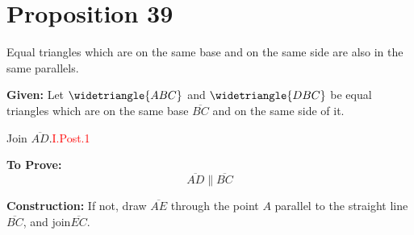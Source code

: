 
\section*{Proposition 39}

\begin{thm}
Equal triangles which are on the same base and on the same side are also in the same parallels.
\end{thm}

\textbf{Given:} Let $\widetriangle{ABC}$ and $\widetriangle{DBC}$ be equal triangles which are on the same base $\overline{BC}$ and on the same side of it. 

Join $\overline{AD}$.\hfill\textcolor{red}{I.Post.1}

\begin{figure}[H]
	\caption{}
\end{figure}

\textbf{To Prove:} 
\[\overline{AD} \parallel  \overline{BC}\]

\textbf{Construction:} If not, draw $\overline{AE}$ through the point $A$ parallel to the straight line $\overline{BC}$, and join$ \overline{EC}$.

\begin{figure}[H]
	\caption{}
\end{figure}

